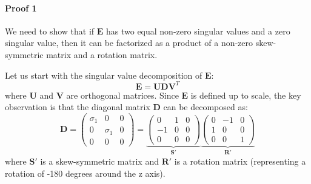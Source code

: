 \documentclass[11pt,a4paper]{article}
\theoremstyle{definition}
\theoremstyle{plain}
\theoremstyle{remark}
\begin{document}
\paragraph{Proof 1}
We need to show that if $\mathbf{E}$ has two equal non-zero singular values and a zero singular value,
 then it can be factorized as a product of a non-zero skew-symmetric matrix and a rotation matrix.

Let us start with the singular value decomposition of $\mathbf{E}$:
\begin{equation} \label{eq:svd_E}
    \mathbf{E} = \mathbf{U} \mathbf{D} \mathbf{V}^T
\end{equation}
where $\mathbf{U}$ and $\mathbf{V}$ are orthogonal matrices. Since $\mathbf{E}$ is defined up to scale, the key observation is that the diagonal matrix $\mathbf{D}$ can be decomposed as:
\begin{equation} \label{eq:D_decomposition}
    \mathbf{D} = \begin{pmatrix}
    \sigma_1 & 0 & 0 \\
    0 & \sigma_1 & 0 \\
    0 & 0 & 0
    \end{pmatrix}
    = \underbrace{\begin{pmatrix}
        0 & 1 & 0 \\
        -1 & 0 & 0 \\
        0 & 0 & 0
    \end{pmatrix}}_{\mathbf{S'}} \underbrace{
    \begin{pmatrix}
        0 & -1 & 0 \\
        1 & 0 & 0 \\
        0 & 0 & 1
    \end{pmatrix}}_{\mathbf{R'}}
\end{equation}
where $\mathbf{S'}$ is a skew-symmetric matrix and $\mathbf{R'}$ is a rotation matrix (representing a rotation of -180 degrees around the z axis).
\end{document}
